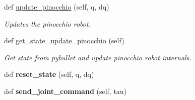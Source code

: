 \begin{DoxyCompactItemize}
\item 
def \hyperlink{classpython_1_1py__pinocchio__bullet_1_1wrapper_1_1PinBulletWrapper_a2c79661f50580185498007e5755c774d}{update\+\_\+pinocchio} (self, q, dq)
\begin{DoxyCompactList}\small\item\em Updates the pinocchio robot. \end{DoxyCompactList}\item 
def \hyperlink{classpython_1_1py__pinocchio__bullet_1_1wrapper_1_1PinBulletWrapper_ab4ea626824c8043f48aa3c57b7504426}{get\+\_\+state\+\_\+update\+\_\+pinocchio} (self)
\begin{DoxyCompactList}\small\item\em Get state from pybullet and update pinocchio robot internals. \end{DoxyCompactList}\item 
def {\bfseries reset\+\_\+state} (self, q, dq)\hypertarget{classpython_1_1py__pinocchio__bullet_1_1wrapper_1_1PinBulletWrapper_a99f63187e0e22633340040f4451fe137}{}\label{classpython_1_1py__pinocchio__bullet_1_1wrapper_1_1PinBulletWrapper_a99f63187e0e22633340040f4451fe137}

\item 
def {\bfseries send\+\_\+joint\+\_\+command} (self, tau)\hypertarget{classpython_1_1py__pinocchio__bullet_1_1wrapper_1_1PinBulletWrapper_a6c97fd610f27ceeb781124933ca94c45}{}\label{classpython_1_1py__pinocchio__bullet_1_1wrapper_1_1PinBulletWrapper_a6c97fd610f27ceeb781124933ca94c45}

\end{DoxyCompactItemize}
